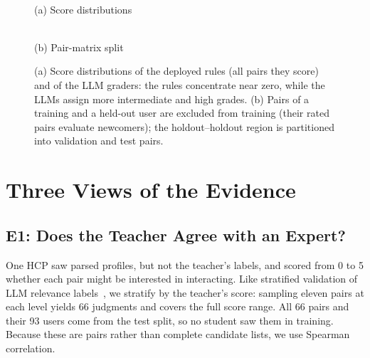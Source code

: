 \documentclass[runningheads,a4paper]{llncs}
\begin{document}

\begin{figure}[!htb]
\centering
\begin{minipage}[b]{0.38\linewidth}
\centering
\resizebox{!}{3.55cm}{}\\[-2pt]
\small (a) Score distributions
\end{minipage}\hfill
\begin{minipage}[b]{0.60\linewidth}
\centering
\resizebox{!}{3.55cm}{\datasetSplitDiagram}\\[-2pt]
\small (b) Pair-matrix split
\end{minipage}
\caption{(a) Score distributions of the deployed rules (all pairs they score)
and of the LLM graders: the rules concentrate near zero, while the LLMs assign
more intermediate and high grades. (b) Pairs of a training and a held-out user are excluded from training (their
rated pairs evaluate newcomers); the holdout--holdout region is partitioned into
validation and test pairs.}
\label{fig:score-and-split}
\end{figure}

\section{Three Views of the Evidence}
\label{sec:findings}
\subsection{E1: Does the Teacher Agree with an Expert?}
One HCP saw parsed profiles, but not the teacher's
labels, and scored from 0 to 5 whether each pair might be interested in
interacting. Like stratified validation of LLM relevance labels~\cite{merlo2026stratified}, we
stratify by the teacher's score: sampling eleven pairs at each level yields 66
judgments and covers the full score range. All 66
pairs and their 93 users come from the test split, so no student saw them in
training.
Because these are pairs rather than complete candidate lists, we use
Spearman correlation.
\end{document}

